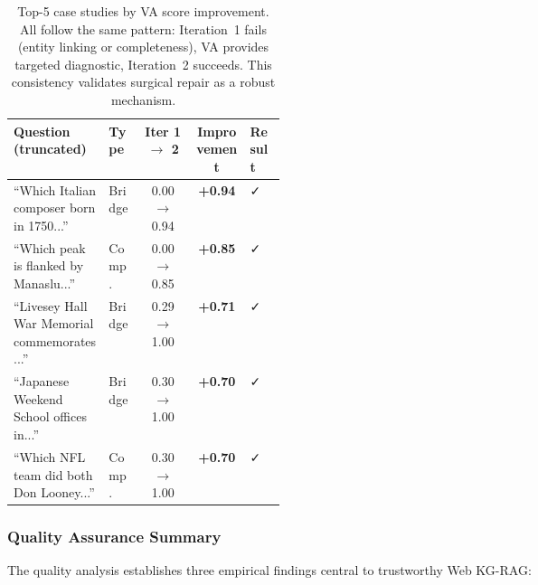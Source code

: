 \begin{table}[t]
\centering
\caption{Top-5 case studies by VA score improvement. All follow the same pattern:
Iteration~1 fails (entity linking or completeness), VA provides targeted
diagnostic, Iteration~2 succeeds. This consistency validates surgical repair as
a robust mechanism.}
\label{tab:case_study_examples}
\small
\begin{tabular}{p{0.35\linewidth}lccl}
\toprule
Question (truncated) & Type & Iter 1 $\to$ 2 & Improvement & Result \\
\midrule
``Which Italian composer born in 1750...'' & Bridge & 0.00 $\to$ 0.94 & \textbf{+0.94} & ✓ \\
``Which peak is flanked by Manaslu...''    & Comp.  & 0.00 $\to$ 0.85 & \textbf{+0.85} & ✓ \\
``Livesey Hall War Memorial commemorates...'' & Bridge & 0.29 $\to$ 1.00 & \textbf{+0.71} & ✓ \\
``Japanese Weekend School offices in...''  & Bridge & 0.30 $\to$ 1.00 & \textbf{+0.70} & ✓ \\
``Which NFL team did both Don Looney...''  & Comp.  & 0.30 $\to$ 1.00 & \textbf{+0.70} & ✓ \\
\bottomrule
\end{tabular}
\end{table}

\subsubsection{Quality Assurance Summary}

The quality analysis establishes three empirical findings central to trustworthy
Web KG-RAG:

